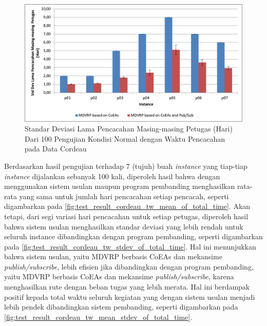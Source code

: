 \begin{figure}[!]
	\centering
	\includegraphics[width=\textwidth]{Resources/Images/test_result_cordeau_tw_stdev_of_total_time}
	\captionsetup{format=hang}
	\caption{Standar Deviasi Lama Pencacahan Masing-masing Petugas (Hari) Dari 100 Pengujian Kondisi Normal dengan Waktu Pencacahan pada Data Cordeau}
	\label{fig:test_result_cordeau_tw_stdev_of_total_time}
\end{figure}


Berdasarkan hasil pengujian terhadap 7 (tujuh) buah \textit{instance} yang tiap-tiap \textit{instance} dijalankan sebanyak 100 kali, diperoleh hasil bahwa dengan menggunakan sistem usulan maupun program pembanding menghasilkan rata-rata yang sama untuk jumlah hari pencacahan setiap pencacah, seperti digambarkan pada \autoref{fig:test_result_cordeau_tw_mean_of_total_time}. Akan tetapi, dari segi variasi hari pencacahan untuk setiap petugas, diperoleh hasil bahwa sistem usulan menghasilkan standar deviasi yang lebih rendah untuk seluruh instance dibandingkan dengan program pembanding, seperti digambarkan pada \autoref{fig:test_result_cordeau_tw_stdev_of_total_time}. Hal ini menunjukkan bahwa sistem usulan, yaitu MDVRP berbasis CoEAs dan mekansime \textit{publish/subscribe}, lebih efisien jika dibandingkan dengan program pembanding, yaitu MDVRP berbasis CoEAs dan mekansime \textit{publish/subscribe}, karena menghasilkan rute dengan beban tugas yang lebih merata. Hal ini berdampak positif kepada total waktu seluruh kegiatan yang dengan sistem usulan menjadi lebih pendek dibandingkan sistem pembanding, seperti digambarkan pada \autoref{fig:test_result_cordeau_tw_mean_stdev_of_total_time}.


